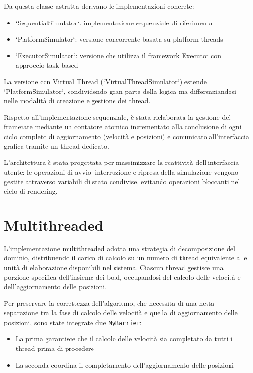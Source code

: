 \documentclass[a4paper,12pt]{report}
\begin{document}
Da questa classe astratta derivano le implementazioni concrete:
\begin{itemize}
    \item `SequentialSimulator`: implementazione sequenziale di riferimento
    \item `PlatformSimulator`: versione concorrente basata su platform threads
    \item `ExecutorSimulator`: versione che utilizza il framework Executor con approccio task-based
\end{itemize}

La versione con Virtual Thread (`VirtualThreadSimulator`) estende `PlatformSimulator`, condividendo gran parte della logica ma differenziandosi nelle modalità di creazione e gestione dei thread.

Rispetto all'implementazione sequenziale, è stata rielaborata la gestione del framerate mediante un contatore atomico incrementato alla conclusione di ogni ciclo completo di aggiornamento (velocità e posizioni) e comunicato all'interfaccia grafica tramite un thread dedicato.

L'architettura è stata progettata per massimizzare la reattività dell'interfaccia utente: le operazioni di avvio, interruzione e ripresa della simulazione vengono gestite attraverso variabili di stato condivise, evitando operazioni bloccanti nel ciclo di rendering.

\section{Multithreaded}
L'implementazione multithreaded adotta una strategia di decomposizione del dominio, distribuendo il carico di calcolo su un numero di thread equivalente alle unità di elaborazione disponibili nel sistema. Ciascun thread gestisce una porzione specifica dell'insieme dei boid, occupandosi del calcolo delle velocità e dell'aggiornamento delle posizioni.

Per preservare la correttezza dell'algoritmo, che necessita di una netta separazione tra la fase di calcolo delle velocità e quella di aggiornamento delle posizioni, sono state integrate due \texttt{MyBarrier}:
\begin{itemize}
    \item La prima garantisce che il calcolo delle velocità sia completato da tutti i thread prima di procedere
    \item La seconda coordina il completamento dell'aggiornamento delle posizioni
\end{itemize}
\end{document}
